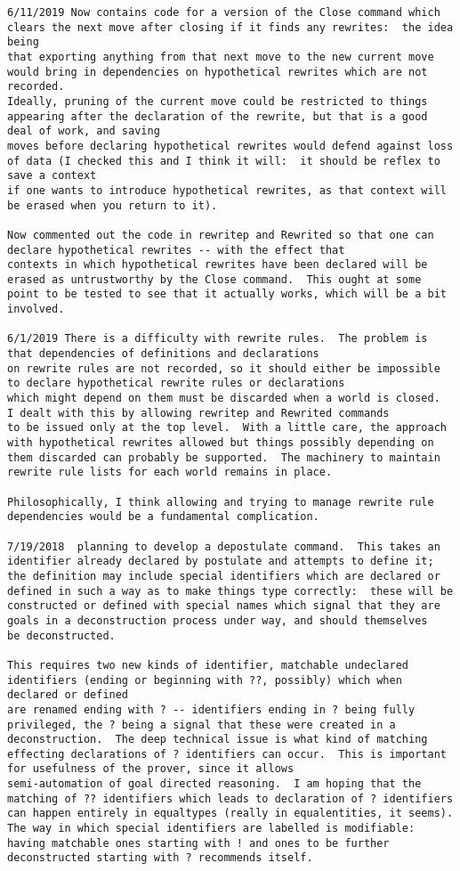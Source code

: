 \documentclass{article}
\begin{document}
{\begin{verbatim}
6/11/2019 Now contains code for a version of the Close command which clears the next move after closing if it finds any rewrites:  the idea being
that exporting anything from that next move to the new current move would bring in dependencies on hypothetical rewrites which are not recorded.
Ideally, pruning of the current move could be restricted to things appearing after the declaration of the rewrite, but that is a good deal of work, and saving
moves before declaring hypothetical rewrites would defend against loss of data (I checked this and I think it will:  it should be reflex to save a context
if one wants to introduce hypothetical rewrites, as that context will be erased when you return to it).

Now commented out the code in rewritep and Rewrited so that one can declare hypothetical rewrites -- with the effect that 
contexts in which hypothetical rewrites have been declared will be erased as untrustworthy by the Close command.  This ought at some
point to be tested to see that it actually works, which will be a bit involved.

6/1/2019 There is a difficulty with rewrite rules.  The problem is that dependencies of definitions and declarations
on rewrite rules are not recorded, so it should either be impossible to declare hypothetical rewrite rules or declarations
which might depend on them must be discarded when a world is closed.  I dealt with this by allowing rewritep and Rewrited commands
to be issued only at the top level.  With a little care, the approach with hypothetical rewrites allowed but things possibly depending on
them discarded can probably be supported.  The machinery to maintain rewrite rule lists for each world remains in place.

Philosophically, I think allowing and trying to manage rewrite rule dependencies would be a fundamental complication.

7/19/2018  planning to develop a depostulate command.  This takes an identifier already declared by postulate and attempts to define it;
the definition may include special identifiers which are declared or defined in such a way as to make things type correctly:  these will be
constructed or defined with special names which signal that they are goals in a deconstruction process under way, and should themselves
be deconstructed.

This requires two new kinds of identifier, matchable undeclared identifiers (ending or beginning with ??, possibly) which when declared or defined
are renamed ending with ? -- identifiers ending in ? being fully privileged, the ? being a signal that these were created in a deconstruction.  The deep technical issue is what kind of matching effecting declarations of ? identifiers can occur.  This is important for usefulness of the prover, since it allows
semi-automation of goal directed reasoning.  I am hoping that the matching of ?? identifiers which leads to declaration of ? identifiers
can happen entirely in equaltypes (really in equalentities, it seems).  The way in which special identifiers are labelled is modifiable:
having matchable ones starting with ! and ones to be further deconstructed starting with ? recommends itself.


\end{verbatim}}
\end{document}
